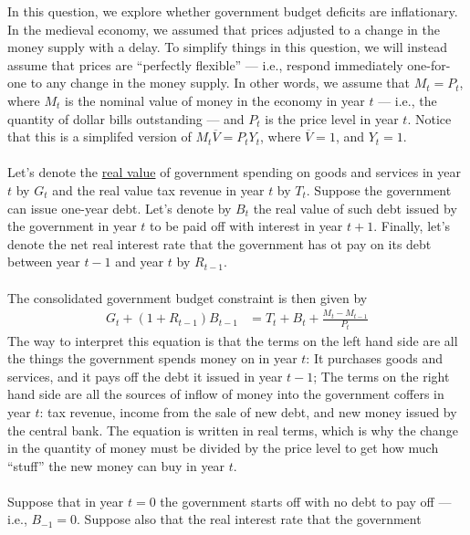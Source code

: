 \begin{homeworkProblem}[1]
    In this question, we explore whether government budget deficits are 
    inflationary. In the medieval economy, we assumed that prices adjusted
    to a change in the money supply with a delay. To simplify things in this
    question, we will instead assume that prices are ``perfectly flexible'' ---
    i.e., respond immediately one-for-one to any change in the money supply.
    In other words, we assume that $M_t = P_t$, where $M_t$ is the nominal 
    value of money in the economy in year $t$ --- i.e., the quantity of dollar
    bills outstanding --- and $P_t$ is the price level in year $t$. Notice that
    this is a simplifed version of $M_t \overline{V} = P_t Y_t$, where $\overline{V}
    = 1$, and $Y_t = 1$. 
    \\ \\
    Let's denote the \underline{real value} of government spending on goods and 
    services in year $t$ by $G_t$ and the real value tax revenue in year $t$ by
    $T_t$. Suppose the government can issue one-year debt. Let's denote by $B_t$
    the real value of such debt issued by the government in year $t$ to be paid 
    off with interest in year $t+1$. Finally, let's denote the net real interest
    rate that the government has ot pay on its debt between year $t-1$ and year $t$
    by $R_{t-1}$.
    \\ \\
    The consolidated government budget constraint is then given by
    \[
        \begin{split}
            G_t + (1 + R_{t-1}) B_{t-1} &= T_t + B_t + \frac{M_t - M_{t-1}}{P_t}
        \end{split}
    \]
    The way to interpret this equation is that the terms on the left hand side are
    all the things the government spends money on in year $t$: It purchases goods
    and services, and it pays off the debt it issued in year $t-1$; The terms on the
    right hand side are all the sources of inflow of money into the government 
    coffers in year $t$: tax revenue, income from the sale of new debt, and new money
    issued by the central bank. The equation is written in real terms, which is why
    the change in the quantity of money must be divided by the price level to get how
    much ``stuff'' the new money can buy in year $t$.
    \\ \\
    Suppose that in year $t=0$ the government starts off with no debt to pay off ---
    i.e., $B_{-1} = 0$. Suppose also that the real interest rate that the government

\end{homeworkProblem}
